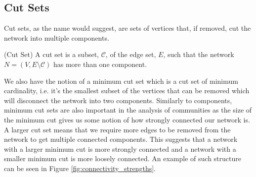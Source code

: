 \newpage
\subsection{Cut Sets}
Cut sets, as the name would suggest, are sets of vertices that, if removed, cut the network into multiple components. 

\begin{definition}{(Cut Set)}
    A cut set is a subset, $\mathcal{C}$, of the edge set, $E$, such that the network $N = (V, E\setminus\mathcal{C})$ has more than one component.
\end{definition}

We also have the notion of a minimum cut set which is a cut set of minimum cardinality, i.e. it's the smallest subset of the vertices that can be removed which will disconnect the network into two components. Similarly to components, minimum cut sets are also important in the analysis of communities as the size of the minimum cut gives us some notion of how strongly connected our network is. A larger cut set means that we require more edges to be removed from the network to get multiple connected components. This suggests that a network with a larger minimum cut is more strongly connected and a network with a smaller minimum cut is more loosely connected. An example of such structure can be seen in Figure \ref{fig:connectivity_strengths}.


